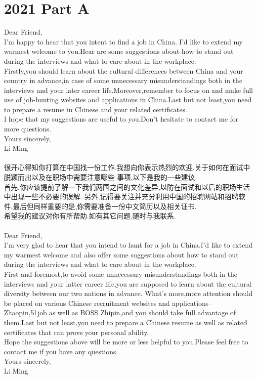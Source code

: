 \documentclass[UTF8]{article}
\begin{document}
    \section*{2021 Part A}
    Dear Friend,\\
    I'm happy to hear that you intent to find a job in China.
    I'd like to extend my warmest welcome to you.Hear are some suggestions 
    about how to stand out during the interviews and what to care about in the workplace.\\
    Firstly,you should learn about the cultural differences between China and your country in 
    advance,in case of some unnecessary misunderstandings both in the interviews and your later 
    career life.Moreover,remember to focus on and make full use of job-hunting websites and 
    applications in China.Last but not least,you need to prepare a resume in Chinese and 
    your related certificates.\\
    I hope that my suggestions are useful to you.Don't hesitate to contact me for more questions.\\
    Yours sincerely,\\
    Li Ming\\
    \\
    很开心得知你打算在中国找一份工作.我想向你表示热烈的欢迎.关于如何在面试中脱颖而出以及在职场中需要注意哪些
    事项,以下是我的一些建议.\\
    首先,你应该提前了解一下我们两国之间的文化差异,以防在面试和以后的职场生活中出现一些不必要的误解.
    另外,记得要关注并充分利用中国的招聘网站和招聘软件.最后但同样重要的是,你需要准备一份中文简历以及相关证书.\\
    希望我的建议对你有所帮助.如有其它问题,随时与我联系.\\
    \\
    Dear Friend,\\
    I'm very glad to hear that you intend to hunt for a job in China.I'd like to extend my warmest welcome 
    and also offer some suggestions about how to stand out during the interviews and what to care about in 
    the workplace.\\
    First and foremost,to avoid some unnecessary misunderstandings both in the interviews and your latter 
    career life,you are supposed to learn about the cultural diversity between our two nations in advance.
    What's more,more attention should be placed on various Chinese recruitment websites and applications--
    Zhaopin,51job as well as BOSS Zhipin,and you should take full advantage of them.Last but not least,you 
    need to prepare a Chinese resume as well as related certificates that can prove your personal ability.\\
    Hope the suggestions above will be more or less helpful to you.Please feel free to contact me if you 
    have any questions.\\
    Yours sincerely,\\
    Li Ming\\
\end{document}
